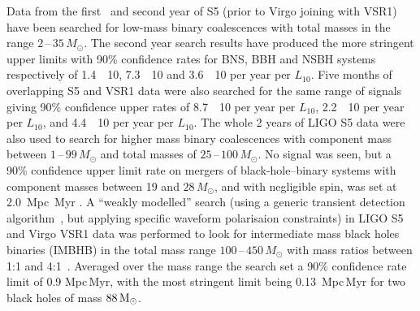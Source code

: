 Data from the first~\cite{Abbott:2009e} and second year of S5 (prior to Virgo joining with 
VSR1)~\cite{Abbott:2009f} have been searched for low-mass binary coalescences with total masses in the range 
$2$\,--\,$35\,M_{\odot}$. The second year search results have produced the more stringent upper limits with 
90\% confidence rates for BNS, BBH and NSBH systems respectively of 1.4~\texttimes~10, 
7.3~\texttimes~10 and 3.6~\texttimes~10 per year per $L_{10}$. Five months of overlapping 
S5 and VSR1 data were also searched for the same range of signals~\cite{Abadie:2010f} giving 90\% confidence 
upper rates of 8.7~\texttimes~10 per year per $L_{10}$, 2.2~\texttimes~10 per year per 
$L_{10}$, and 4.4~\texttimes~10 per year per $L_{10}$. The whole 2 years of LIGO S5 data were also 
used to search for higher mass binary coalescences with component mass between $1$\,--\,$99\,M_{\odot}$ and 
total masses of $25$\,--\,$100\,M_{\odot}$. No signal was seen, but a 90\% confidence upper limit rate on 
mergers of black-hole--binary systems with component masses between 19 and $28\,M_{\odot}$, and with 
negligible spin, was set at 2.0~Mpc~Myr \cite{Abadie:2011a}. A ``weakly modelled'' search 
(using a generic transient detection algorithm~\cite{2008CQGra..25k4029K}, but applying specific waveform 
polarisaion constraints) in LIGO S5 and Virgo VSR1 data was performed to look for intermediate mass black 
holes binaries (IMBHB) in the total mass range $100$\,--\,$450\,M_{\odot}$ with mass ratios between 1:1 and 
4:1~\cite{2012PhRvD..85j2004A}. Averaged over the mass range the search set a 90\% confidence rate limit of 
0.9 Mpc\,Myr, with the most stringent limit being 0.13~Mpc\,Myr for 
two black holes of mass $88\,{\rm M}_{\odot}$. 

